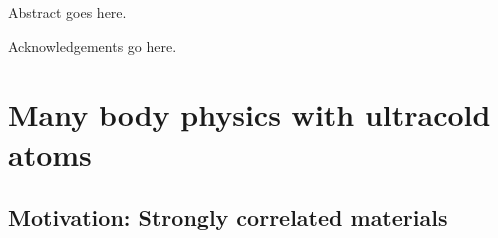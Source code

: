 \documentclass[oneside,11pt]{memoir}
\begin{document}
\pagestyle{plain}          %

\frontmatter
\thetitlepage



\riceabstract
\pagestyle{empty}  %

Abstract goes here. 

\pagestyle{plain} %

 
\riceacknowledgements

Acknowledgements go here. 


\tableofcontents*  %






\mainmatter
\pagestyle{rice}


\let\oldparskip\parskip
\setlength{\parskip}{0.8em}




\chapter{Many body physics with ultracold atoms } 

\section{ Motivation:  Strongly correlated materials }
\end{document}
